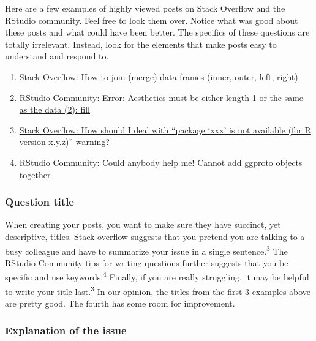 \documentclass[
  letterpaper,
  DIV=11,
  numbers=noendperiod]{scrreprt}
\begin{document}
Here are a few examples of highly viewed posts on Stack Overflow and the
RStudio community. Feel free to look them over. Notice what was good
about these posts and what could have been better. The specifics of
these questions are totally irrelevant. Instead, look for the elements
that make posts easy to understand and respond to.

\begin{enumerate}
\def\labelenumi{\arabic{enumi}.}
\item
  \href{https://stackoverflow.com/questions/1299871/how-to-join-merge-data-frames-inner-outer-left-right}{Stack
  Overflow: How to join (merge) data frames (inner, outer, left, right)}
\item
  \href{https://community.rstudio.com/t/error-aesthetics-must-be-either-length-1-or-the-same-as-the-data-2-fill/15579}{RStudio
  Community: Error: Aesthetics must be either length 1 or the same as
  the data (2): fill}
\item
  \href{https://stackoverflow.com/questions/25721884/how-should-i-deal-with-package-xxx-is-not-available-for-r-version-x-y-z-wa}{Stack
  Overflow: How should I deal with ``package `xxx' is not available (for
  R version x.y.z)'' warning?}
\item
  \href{https://community.rstudio.com/t/could-anybody-help-me-cannot-add-ggproto-objects-together/11271/4}{RStudio
  Community: Could anybody help me! Cannot add ggproto objects together}
\end{enumerate}

\subsubsection{Question title}\label{question-title}

When creating your posts, you want to make sure they have succinct, yet
descriptive, titles. Stack overflow suggests that you pretend you are
talking to a busy colleague and have to summarize your issue in a single
sentence.\textsuperscript{3} The RStudio Community tips for writing
questions further suggests that you be specific and use
keywords.\textsuperscript{4} Finally, if you are really struggling, it
may be helpful to write your title last.\textsuperscript{3} In our
opinion, the titles from the first 3 examples above are pretty good. The
fourth has some room for improvement.

\subsubsection{Explanation of the issue}\label{explanation-of-the-issue}
\end{document}
